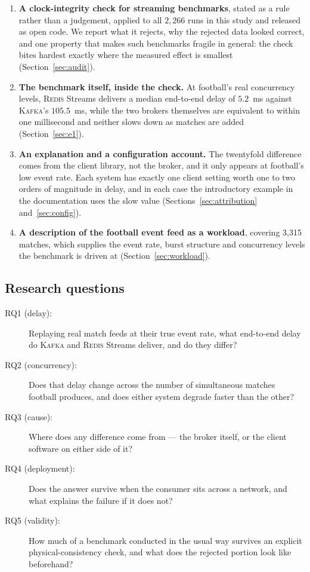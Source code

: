 \documentclass[Afour,sageh,times]{sagej}
\newcommand{\redis}{\textsc{Redis}}
\newcommand{\kafka}{\textsc{Kafka}}
\begin{document}
\begin{enumerate}
\item \textbf{A clock-integrity check for streaming benchmarks}, stated as a rule rather than a
judgement, applied to all $2{,}266$ runs in this study and released as open code. We report what
it rejects, why the rejected data looked correct, and one property that makes such benchmarks
fragile in general: the check bites hardest exactly where the measured effect is smallest
(Section~\ref{sec:audit}).
\item \textbf{The benchmark itself, inside the check.} At football's real concurrency levels,
\redis{} Streams delivers a median end-to-end delay of $5.2$~ms against \kafka{}'s $105.5$~ms,
while the two brokers themselves are equivalent to within one millisecond and neither slows down
as matches are added (Section~\ref{sec:e1}).
\item \textbf{An explanation and a configuration account.} The twentyfold difference comes from
the client library, not the broker, and it only appears at football's low event rate. Each system
has exactly one client setting worth one to two orders of magnitude in delay, and in each case
the introductory example in the documentation uses the slow value
(Sections~\ref{sec:attribution} and~\ref{sec:config}).
\item \textbf{A description of the football event feed as a workload}, covering 3{,}315 matches,
which supplies the event rate, burst structure and concurrency levels the benchmark is driven at
(Section~\ref{sec:workload}).
\end{enumerate}

\subsection{Research questions}
\label{sec:rqs}

\begin{description}
\item[RQ1 (delay):] Replaying real match feeds at their true event rate, what end-to-end delay do
\kafka{} and \redis{} Streams deliver, and do they differ?
\item[RQ2 (concurrency):] Does that delay change across the number of simultaneous matches
football produces, and does either system degrade faster than the other?
\item[RQ3 (cause):] Where does any difference come from --- the broker itself, or the client
software on either side of it?
\item[RQ4 (deployment):] Does the answer survive when the consumer sits across a network, and
what explains the failure if it does not?
\item[RQ5 (validity):] How much of a benchmark conducted in the usual way survives an explicit
physical-consistency check, and what does the rejected portion look like beforehand?
\end{description}
\end{document}
